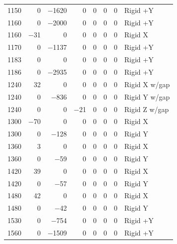 \begin{longtable}{lrrrrrrl}
    1150 & \num{0} & \num{-1620} & \num{0} & \num{0} & \num{0} & \num{0} & Rigid +Y \\
    1160 & \num{0} & \num{-2000} & \num{0} & \num{0} & \num{0} & \num{0} & Rigid +Y \\
    1160 & \num{-31} & \num{0} & \num{0} & \num{0} & \num{0} & \num{0} & Rigid X \\
    1170 & \num{0} & \num{-1137} & \num{0} & \num{0} & \num{0} & \num{0} & Rigid +Y \\
    1183 & \num{0} & \num{0} & \num{0} & \num{0} & \num{0} & \num{0} & Rigid +Y \\
    1186 & \num{0} & \num{-2935} & \num{0} & \num{0} & \num{0} & \num{0} & Rigid +Y \\
    1240 & \num{32} & \num{0} & \num{0} & \num{0} & \num{0} & \num{0} & Rigid X w/gap \\
    1240 & \num{0} & \num{-836} & \num{0} & \num{0} & \num{0} & \num{0} & Rigid Y w/gap \\
    1240 & \num{0} & \num{0} & \num{-21} & \num{0} & \num{0} & \num{0} & Rigid Z w/gap \\
    1300 & \num{-70} & \num{0} & \num{0} & \num{0} & \num{0} & \num{0} & Rigid X \\
    1300 & \num{0} & \num{-128} & \num{0} & \num{0} & \num{0} & \num{0} & Rigid Y \\
    1360 & \num{3} & \num{0} & \num{0} & \num{0} & \num{0} & \num{0} & Rigid X \\
    1360 & \num{0} & \num{-59} & \num{0} & \num{0} & \num{0} & \num{0} & Rigid Y \\
    1420 & \num{39} & \num{0} & \num{0} & \num{0} & \num{0} & \num{0} & Rigid X \\
    1420 & \num{0} & \num{-57} & \num{0} & \num{0} & \num{0} & \num{0} & Rigid Y \\
    1480 & \num{42} & \num{0} & \num{0} & \num{0} & \num{0} & \num{0} & Rigid X \\
    1480 & \num{0} & \num{-42} & \num{0} & \num{0} & \num{0} & \num{0} & Rigid Y \\
    1530 & \num{0} & \num{-754} & \num{0} & \num{0} & \num{0} & \num{0} & Rigid +Y \\
    1560 & \num{0} & \num{-1509} & \num{0} & \num{0} & \num{0} & \num{0} & Rigid +Y \\
\end{longtable}
\endgroup
